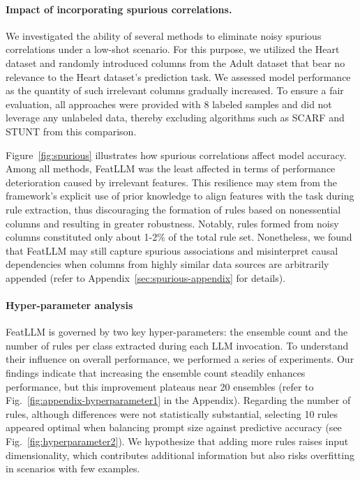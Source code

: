 \vspace*{-0.12in}
\paragraph{Impact of incorporating spurious correlations.} We investigated the ability of several methods to eliminate noisy spurious correlations under a low-shot scenario. For this purpose, we utilized the Heart dataset and randomly introduced columns from the Adult dataset that bear no relevance to the Heart dataset's prediction task. We assessed model performance as the quantity of such irrelevant columns gradually increased. To ensure a fair evaluation, all approaches were provided with 8 labeled samples and did not leverage any unlabeled data, thereby excluding algorithms such as SCARF and STUNT from this comparison.

Figure~\ref{fig:spurious} illustrates how spurious correlations affect model accuracy. Among all methods, \textsf{FeatLLM} was the least affected in terms of performance deterioration caused by irrelevant features. This resilience may stem from the framework's explicit use of prior knowledge to align features with the task during rule extraction, thus discouraging the formation of rules based on nonessential columns and resulting in greater robustness. Notably, rules formed from noisy columns constituted only about 1-2\% of the total rule set. Nonetheless, we found that \textsf{FeatLLM} may still capture spurious associations and misinterpret causal dependencies when columns from highly similar data sources are arbitrarily appended (refer to Appendix~\ref{sec:spurious-appendix} for details).

\vspace*{-0.12in}
\paragraph{Hyper-parameter analysis}
\textsf{FeatLLM} is governed by two key hyper-parameters: the ensemble count and the number of rules per class extracted during each LLM invocation. To understand their influence on overall performance, we performed a series of experiments. Our findings indicate that increasing the ensemble count steadily enhances performance, but this improvement plateaus near 20 ensembles (refer to Fig.~\ref{fig:appendix-hyperparameter1} in the Appendix). Regarding the number of rules, although differences were not statistically substantial, selecting 10 rules appeared optimal when balancing prompt size against predictive accuracy (see Fig.~\ref{fig:hyperparameter2}). We hypothesize that adding more rules raises input dimensionality, which contributes additional information but also risks overfitting in scenarios with few examples.

